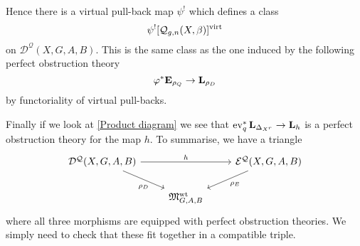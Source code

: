 Hence there is a virtual pull-back map $\psi^!$ which defines a class
\begin{equation*}\psi^! [\mathcal{Q}_{g,n}(X,\beta)]^{\operatorname{virt}} \end{equation*}
on $\mathcal{D}^{\mathcal{Q}}(X,G,A,B)$. This is the same class as the one induced by the following perfect obstruction theory
\begin{equation*} \varphi^* \mathbf{E}_{\rho_Q} \rightarrow \mathbf{L}_{\rho_D} \end{equation*}
by functoriality of virtual pull-backs.

Finally if we look at \eqref{Product diagram} we see that $\operatorname{ev}_q^* \mathbf{L}_{\Delta_{X^r}} \rightarrow \mathbf{L}_h$ is a perfect obstruction theory for the map $h$. To summarise, we have a triangle
\begin{equation}\label{D-E-triangle}
 \begin{tikzcd}
  \D{X}{G,A}{B} \ar[dr,"\rho_D" below=0.1cm] \ar[rr,"h"] & & \E{X}{G,A}{B}\ar[dl,"\rho_E"] \\
& \MM_{G,A,B}^{\operatorname{wt}} &
 \end{tikzcd}
\end{equation}
where all three morphisms are equipped with perfect obstruction theories. We simply need to check that these fit together in a compatible triple.

